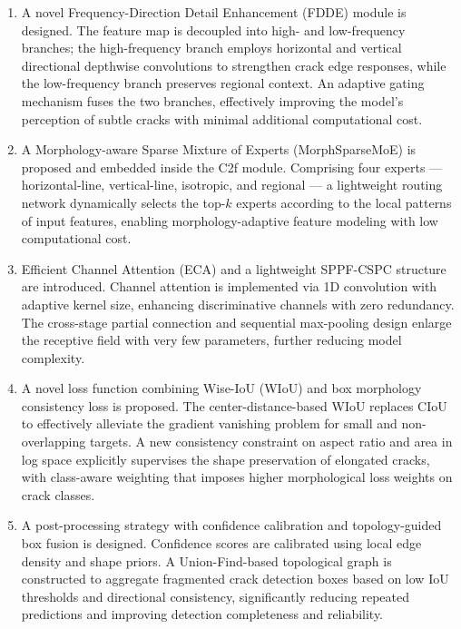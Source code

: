 \documentclass[twocolumn]{sn-jnl}
\begin{document}
	\begin{enumerate}
		\item A novel Frequency-Direction Detail Enhancement (FDDE) module is designed. The feature map is decoupled into high- and low-frequency branches; the high-frequency branch employs horizontal and vertical directional depthwise convolutions to strengthen crack edge responses, while the low-frequency branch preserves regional context. An adaptive gating mechanism fuses the two branches, effectively improving the model's perception of subtle cracks with minimal additional computational cost.

		\item A Morphology-aware Sparse Mixture of Experts (MorphSparseMoE) is proposed and embedded inside the C2f module. Comprising four experts --- horizontal-line, vertical-line, isotropic, and regional --- a lightweight routing network dynamically selects the top-$k$ experts according to the local patterns of input features, enabling morphology-adaptive feature modeling with low computational cost.

		\item Efficient Channel Attention (ECA) and a lightweight SPPF-CSPC structure are introduced. Channel attention is implemented via 1D convolution with adaptive kernel size, enhancing discriminative channels with zero redundancy. The cross-stage partial connection and sequential max-pooling design enlarge the receptive field with very few parameters, further reducing model complexity.

		\item A novel loss function combining Wise-IoU (WIoU) and box morphology consistency loss is proposed. The center-distance-based WIoU replaces CIoU to effectively alleviate the gradient vanishing problem for small and non-overlapping targets. A new consistency constraint on aspect ratio and area in log space explicitly supervises the shape preservation of elongated cracks, with class-aware weighting that imposes higher morphological loss weights on crack classes.

		\item A post-processing strategy with confidence calibration and topology-guided box fusion is designed. Confidence scores are calibrated using local edge density and shape priors. A Union-Find-based topological graph is constructed to aggregate fragmented crack detection boxes based on low IoU thresholds and directional consistency, significantly reducing repeated predictions and improving detection completeness and reliability.
	\end{enumerate}
\end{document}

